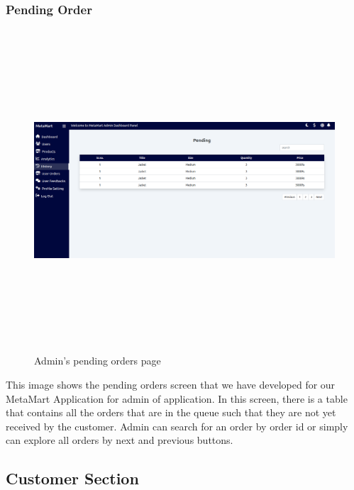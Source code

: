 \subsubsection{Pending Order}
\begin{figure}[H]
    \centering
    \includegraphics[width=15cm,height=12cm]{Figures/Customer_Section_Images/PendingOrderDetail.png}
    \caption{Admin’s pending orders page}
    \label{Admin’s pending orders page}
\end{figure}
\justifying
This image shows the pending orders screen that we have developed for our MetaMart Application for admin of application. In this screen, there is a table that contains all the orders that are in the queue such that they are not yet received by the customer. Admin can search for an order by order id or simply can explore all orders by next and previous buttons.
\subsection{Customer Section}
